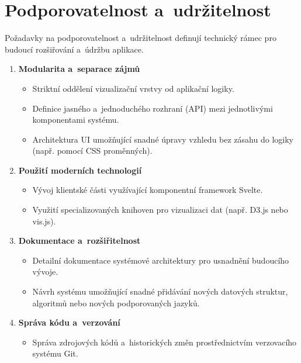 \section{Podporovatelnost a~udržitelnost}
\label{sec:supportability}

Požadavky na podporovatelnost a~udržitelnost definují technický rámec pro budoucí rozšiřování a~údržbu aplikace.

\begin{enumerate}
    \item \textbf{Modularita a~separace zájmů}
          \begin{itemize}[nosep]
              \item Striktní oddělení vizualizační vrstvy od aplikační logiky.
              \item Definice jasného a~jednoduchého rozhraní (API) mezi jednotlivými komponentami systému.
              \item Architektura UI umožňující snadné úpravy vzhledu bez zásahu do logiky (např. pomocí CSS proměnných).
          \end{itemize}

    \item \textbf{Použití moderních technologií}
          \begin{itemize}[nosep]
              \item Vývoj klientské části využívající komponentní framework Svelte.
              \item Využití specializovaných knihoven pro vizualizaci dat (např. D3.js nebo vis.js).
          \end{itemize}

    \item \textbf{Dokumentace a~rozšiřitelnost}
          \begin{itemize}[nosep]
              \item Detailní dokumentace systémové architektury pro usnadnění budoucího vývoje.
              \item Návrh systému umožňující snadné přidávání nových datových struktur, algoritmů nebo nových podporovaných jazyků.
          \end{itemize}

    \item \textbf{Správa kódu a~verzování}
          \begin{itemize}[nosep]
              \item Správa zdrojových kódů a~historických změn prostřednictvím verzovacího systému Git.
          \end{itemize}
\end{enumerate}
